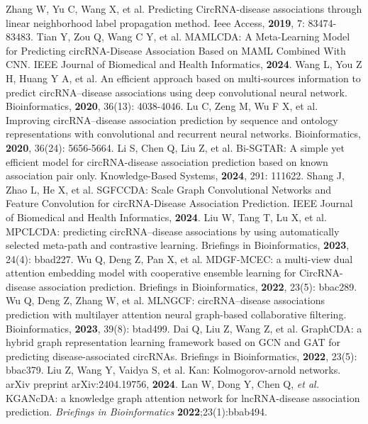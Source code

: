 \documentclass[journal=jcisd8,manuscript=article]{achemso}
\begin{document}
\begin{thebibliography}{}
Zhang W, Yu C, Wang X, et al. Predicting CircRNA-disease associations through linear neighborhood label propagation method. Ieee Access, \textbf{2019}, 7: 83474-83483.
%
Tian Y, Zou Q, Wang C Y, et al. MAMLCDA: A Meta-Learning Model for Predicting circRNA-Disease Association Based on MAML Combined With CNN. IEEE Journal of Biomedical and Health Informatics, \textbf{2024}.
%
Wang L, You Z H, Huang Y A, et al. An efficient approach based on multi-sources information to predict circRNA–disease associations using deep convolutional neural network. Bioinformatics, \textbf{2020}, 36(13): 4038-4046.
%
Lu C, Zeng M, Wu F X, et al. Improving circRNA–disease association prediction by sequence and ontology representations with convolutional and recurrent neural networks. Bioinformatics, \textbf{2020}, 36(24): 5656-5664.
%
Li S, Chen Q, Liu Z, et al. Bi-SGTAR: A simple yet efficient model for circRNA-disease association prediction based on known association pair only. Knowledge-Based Systems, \textbf{2024}, 291: 111622.
Shang J, Zhao L, He X, et al. SGFCCDA: Scale Graph Convolutional Networks and Feature Convolution for circRNA-Disease Association Prediction. IEEE Journal of Biomedical and Health Informatics, \textbf{2024}.
Liu W, Tang T, Lu X, et al. MPCLCDA: predicting circRNA–disease associations by using automatically selected meta-path and contrastive learning. Briefings in Bioinformatics, \textbf{2023}, 24(4): bbad227.
Wu Q, Deng Z, Pan X, et al. MDGF-MCEC: a multi-view dual attention embedding model with cooperative ensemble learning for CircRNA-disease association prediction. Briefings in Bioinformatics, \textbf{2022}, 23(5): bbac289.
Wu Q, Deng Z, Zhang W, et al. MLNGCF: circRNA–disease associations prediction with multilayer attention neural graph-based collaborative filtering. Bioinformatics, \textbf{2023}, 39(8): btad499.
Dai Q, Liu Z, Wang Z, et al. GraphCDA: a hybrid graph representation learning framework based on GCN and GAT for predicting disease-associated circRNAs. Briefings in Bioinformatics, \textbf{2022}, 23(5): bbac379.
Liu Z, Wang Y, Vaidya S, et al. Kan: Kolmogorov-arnold networks. arXiv preprint arXiv:2404.19756, \textbf{2024}.
%
Lan W, Dong Y, Chen Q, {\it et al.} KGANcDA: a knowledge graph attention network for lncRNA-disease association prediction. {\it Briefings in Bioinformatics} \textbf{2022};23(1):bbab494.

\end{thebibliography}
\end{document}
